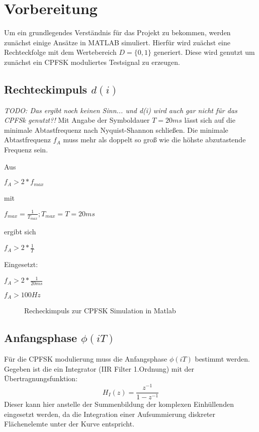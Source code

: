 \documentclass{article}
\begin{document}
\section{Vorbereitung}
Um ein grundlegendes Verständnis für das Projekt zu bekommen, werden zunächst einige Ansätze in MATLAB simuliert.
Hierfür wird zuächst eine Rechteckfolge mit dem Wertebereich $D = \{0,1\}$ generiert. Diese wird genutzt um zunächst ein 
CPFSK moduliertes Testsignal zu erzeugen.

\subsection{Rechteckimpuls $d(i)$}\label{sec:rechteck}
\textit{TODO: Das ergibt noch keinen Sinn... und d(i) wird auch gar nicht für das CPFSk genutzt?!}
Mit Angabe der Symboldauer $T = 20ms$ lässt sich auf die minimale Abtastfrequenz nach Nyquist-Shannon schließen.
Die minimale Abtastfrequenz $f_A$ muss mehr als doppelt so groß wie die höhste abzutastende Frequenz sein.

Aus
\begin{center}
 $
f_A > 2*f_{max}
$
\end{center}

mit 
\begin{center} $f_{max} = \frac{1}{T_{max}} ; T_{max} = T = 20ms$  \end{center}

ergibt sich

\begin{center}
$
f_A > 2*\frac{1}{T}
$
\end{center}

Eingesetzt:
\begin{center}
$f_A > 2*\frac{1}{20ms}$
\end{center}
\begin{center}
$f_A > 100Hz$   
\end{center}
\begin{figure}[!h]
    \centering
    \def\svgscale{0.3}
    \def\svgwidth{\columnwidth}
    \caption{Recheckimpuls zur \ac{CPFSK} Simulation in Matlab}
\end{figure}

\subsection{Anfangsphase $\phi(iT)$}
Für die CPFSK modulierung muss die Anfangsphase $\phi(iT)$ bestimmt werden.
Gegeben ist die ein Integrator (IIR Filter 1.Ordnung) mit der Übertragnungsfunktion:
$$
H_I(z)=\frac{z^{-1}}{1-z^{-1}}
$$
Dieser kann hier anstelle der Summenbildung der komplexen Einhüllenden eingesetzt werden, 
da die Integration einer Aufsummierung diskreter Flächenelemte unter der Kurve entspricht.
\end{document}
